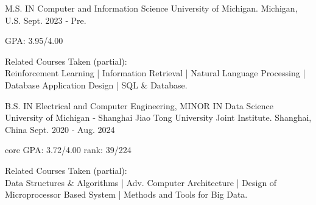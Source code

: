 

\begin{cventries}

\cventry
{M.S. IN Computer and Information Science} %
{University of Michigan.} %
{Michigan, U.S.} %
{Sept. 2023 ‑ Pre.} %
{
  \begin{cvitems} %
    \item {GPA: 3.95/4.00}
    \item {Related Courses Taken (partial):} \\
    Reinforcement Learning | Information Retrieval | Natural Language Processing | Database Application Design | SQL \& Database. \\
  \end{cvitems}
}

\vspace{-0.5cm}
\cventry
{B.S. IN Electrical and Computer Engineering, MINOR IN Data Science} %
{University of Michigan ‑ Shanghai Jiao Tong University Joint Institute.} %
{Shanghai, China} %
{Sept. 2020 ‑ Aug. 2024} %
{
\begin{cvitems} %
  \item {core GPA: 3.72/4.00 \quad rank: 39/224}
  \item {Related Courses Taken (partial): }\\
  Data Structures \& Algorithms | Adv. Computer Architecture | Design of Microprocessor Based System | Methods and Tools for Big Data. 
\end{cvitems}
}

\end{cventries}

